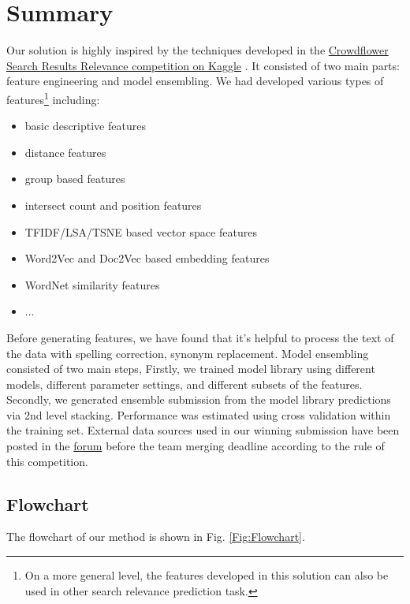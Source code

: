 \documentclass[12pt]{article}
\begin{document}
\section{Summary}
Our solution is highly inspired by the techniques developed in the \href{https://www.kaggle.com/c/crowdflower-search-relevance}{Crowdflower Search Results Relevance competition on Kaggle} \cite{CrowdFlower_1st,crowdflower_2place,crowdflower_3place}. It consisted of two main parts: feature engineering and model ensembling. We had developed various types of features\footnote{On a more general level, the features developed in this solution can also be used in other search relevance prediction task.} including:
\begin{itemize}
\item basic descriptive features
\item distance features
\item group based features
\item intersect count and position features
\item TFIDF/LSA/TSNE based vector space features
\item Word2Vec and Doc2Vec based embedding features
\item WordNet similarity features
\item ...
\end{itemize}
Before generating features, we have found that it's helpful to process the text of the data with spelling correction, synonym replacement. Model ensembling consisted of two main steps, Firstly, we trained model library using different models, different parameter settings, and different subsets of the features. Secondly, we generated ensemble submission from the model library predictions via 2nd level stacking. Performance was estimated using cross validation within the training set. External data sources used in our winning submission have been posted in the \href{https://www.kaggle.com/c/home-depot-product-search-relevance/forums/t/19413/external-data-disclosure-thread}{forum} before the team merging deadline according to the rule of this competition.

\subsection{Flowchart}
The flowchart of our method is shown in Fig. \ref{Fig:Flowchart}.
\end{document}

